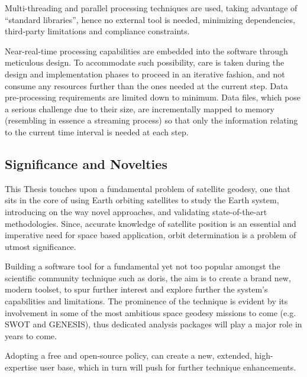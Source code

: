 Multi-threading and parallel processing techniques are used, taking advantage of 
``standard libraries'', hence no external tool is needed, minimizing dependencies, 
third-party limitations and compliance constraints.

Near-real-time processing capabilities are embedded into the software through 
meticulous design. To accommodate such possibility, care is taken during the 
design and implementation phases to proceed in an iterative fashion, and not 
consume any resources further than the ones needed at the current step. Data 
pre-processing requirements are limited down to minimum. Data files, which pose a 
serious challenge due to their size, are incrementally mapped to memory (resembling 
in essence a streaming process) so that only the information relating to the 
current time interval is needed at each step.

\subsection{Significance and Novelties}\label{ssec:significance-and-novelty}
This Thesis touches upon a fundamental problem of satellite geodesy, one that sits 
in the core of using Earth orbiting satellites to study the Earth system, introducing 
on the way novel approaches, and validating state-of-the-art methodologies.
Since, accurate knowledge of satellite position is an essential and imperative need 
for space based application, orbit determination is a problem of utmost significance. 

Building a software tool for a fundamental yet not too popular amongst the 
scientific community technique such as \gls{doris}, the aim is to create a brand new, 
modern toolset, to spur further interest and explore further the system's 
capabilities and limitations. The prominence of the technique is evident by its 
involvement in some of the most ambitious space geodesy missions to come (e.g. 
SWOT and GENESIS), thus dedicated analysis packages will play a major role in 
years to come.

Adopting a free and open-source policy, can create a new, extended, high-expertise 
user base, which in turn will push for further technique enhancements.


